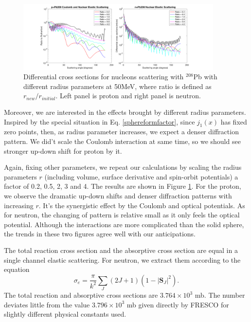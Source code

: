     \begin{figure}[t]
		\centering
		\includegraphics[width=0.92\textwidth]{7.png}
		\caption{Differential cross sections for nucleons scattering with $^{208}$Pb with different radius parameters at 50MeV, where ratio is defined as $r_{new}/r_{initial}$. Left panel is proton and right panel is neutron.  }
		\label{fig:radiusparameter}
	\end{figure}

	Moreover, we are interested in the effects brought by different radius parameters. 
	Inspired by the special situation in Eq. \ref{sphereformfactor}, since $j_1(x)$ has fixed zero points, then, as radius parameter increases, we expect a denser diffraction pattern. 
	We did't scale the Coulomb interaction at same time, so we should see stronger up-down shift for proton by it.
	
	Again, fixing other parameters, we repeat our calculations by scaling the radius parameters $r$ (including volume, surface derivative and spin-orbit potentials) a factor of 0.2, 0.5, 2, 3 and 4. 
	The results are shown in Figure \ref{fig:radiusparameter}.
	For the proton, we observe the dramatic up-down shifts and denser diffraction patterns with increasing $r$. 
	It's the synergistic effect by the Coulomb and optical potentials. 
	As for neutron, the changing of pattern is relative small as it only feels the optical potential. 
	Although the interactions are more complicated than the solid sphere, the trends in these two figures agree well with our anticipations.
	
	The total reaction cross section and the absorptive cross section are equal in a single channel elastic scattering. For neutron, we extract them according to the equation
	\begin{equation}
		\sigma_{e}=\frac{\pi}{k^2}\sum_{J}(2J+1)(1-|\mathbf{S}_J|^2).
			\end{equation}
	The total reaction and absorptive cross sections are $3.764\times 10^3$ mb. The number deviates little from the value $3.796\times 10^3$ mb given directly by FRESCO for slightly different physical constants used.
	
